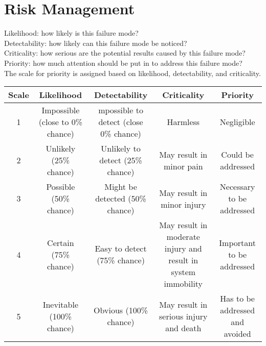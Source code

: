 
\section{Risk Management}
\label{sec:risk}

Likelihood: how likely is this failure mode?\\
Detectability: how likely can this failure mode be noticed?\\
Criticality: how serious are the potential results caused by this failure mode?\\
Priority: how much attention should be put in to address this failure mode? \\
The scale for priority is assigned based on likelihood, detectability, and criticality.\\

\begin{center}
 \begin{tabular}{||c c c c c ||}
 \hline
 Scale & Likelihood & Detectability & Criticality & Priority \\ [0.5ex]
 \hline\hline
 1 & Impossible (close to 0\% chance) & mpossible to detect (close 0\% chance) & Harmless & Negligible \\
 \hline
 2 & Unlikely (25\% chance) & Unlikely to detect (25\% chance) & May result in minor pain & Could be addressed\\
 \hline
 3 & Possible (50\% chance) & Might be detected (50\% chance) & May result in minor injury & Necessary to be addressed\\
 \hline
 4 & Certain (75\% chance) & Easy to detect (75\% chance) & May result in moderate injury and result in system immobility & Important to be addressed\\
 \hline
 5 & Inevitable (100\% chance) & Obvious (100\% chance) & May result in serious injury and death & Has to be addressed and avoided\\
 \hline 
\end{tabular}
\end{center}


